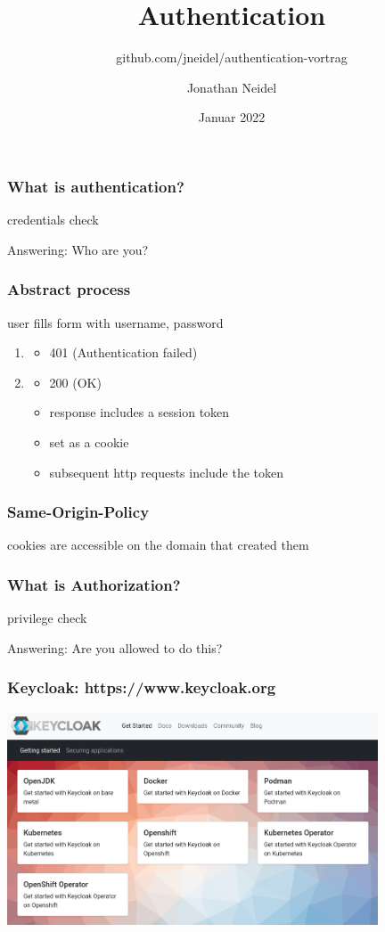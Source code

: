 \documentclass{beamer}
\title{Authentication}
\subtitle{github.com/jneidel/authentication-vortrag}
\author{Jonathan Neidel}
\date{Januar 2022}
\institute{HTW Berlin, Angewandte Informatik, Komponentenbasierte Entwicklung}
\begin{document}
\frame{\titlepage}

\begin{frame}
  \frametitle{What is authentication?}

  credentials check

  \bigskip

  Answering: Who are you?
\end{frame}

\begin{frame}
  \frametitle{Abstract process}

  user fills form with username, password
  \begin{enumerate}
    \item \begin{itemize}
      \item 401 (Authentication failed)
    \end{itemize}
    \item \begin{itemize}
      \item 200 (OK)
      \item response includes a session token
      \item set as a cookie
      \item subsequent http requests include the token
    \end{itemize}
  \end{enumerate}
\end{frame}

\begin{frame}
  \frametitle{Same-Origin-Policy}

  cookies are accessible on the domain that created them
\end{frame}

\begin{frame}
  \frametitle{What is Authorization?}

  privilege check

  \bigskip

  Answering: Are you allowed to do this?
\end{frame}

\begin{frame}
  \frametitle{Keycloak: https://www.keycloak.org}
    \includegraphics[width=11cm]{install}
\end{frame}
\end{document}
